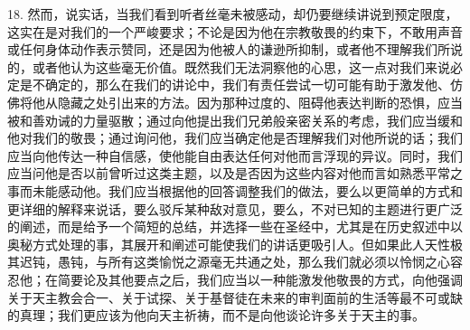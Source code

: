 18. 然而，说实话，当我们看到听者丝毫未被感动，却仍要继续讲说到预定限度，这实在是对我们的一个严峻要求；不论是因为他在宗教敬畏的约束下，不敢用声音或任何身体动作表示赞同，还是因为他被人的谦逊所抑制，或者他不理解我们所说的，或者他认为这些毫无价值。既然我们无法洞察他的心思，这一点对我们来说必定是不确定的，那么在我们的讲论中，我们有责任尝试一切可能有助于激发他、仿佛将他从隐藏之处引出来的方法。因为那种过度的、阻碍他表达判断的恐惧，应当被和善劝诫的力量驱散；通过向他提出我们兄弟般亲密关系的考虑，我们应当缓和他对我们的敬畏；通过询问他，我们应当确定他是否理解我们对他所说的话；我们应当向他传达一种自信感，使他能自由表达任何对他而言浮现的异议。同时，我们应当问他是否以前曾听过这类主题，以及是否因为这些内容对他而言如熟悉平常之事而未能感动他。我们应当根据他的回答调整我们的做法，要么以更简单的方式和更详细的解释来说话，要么驳斥某种敌对意见，要么，不对已知的主题进行更广泛的阐述，而是给予一个简短的总结，并选择一些在圣经中，尤其是在历史叙述中以奥秘方式处理的事，其展开和阐述可能使我们的讲话更吸引人。但如果此人天性极其迟钝，愚钝，与所有这类愉悦之源毫无共通之处，那么我们就必须以怜悯之心容忍他；在简要论及其他要点之后，我们应当以一种能激发他敬畏的方式，向他强调关于天主教会合一、关于试探、关于基督徒在未来的审判面前的生活等最不可或缺的真理；我们更应该为他向天主祈祷，而不是向他谈论许多关于天主的事。\par

